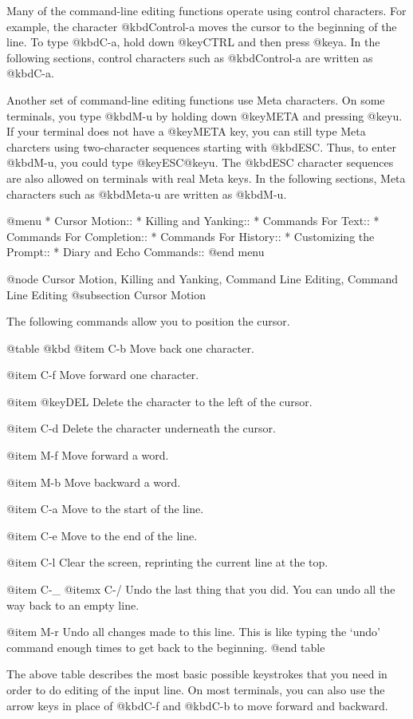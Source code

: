 Many of the command-line editing functions operate using control
characters.  For example, the character @kbd{Control-a} moves the cursor
to the beginning of the line.  To type @kbd{C-a}, hold down @key{CTRL}
and then press @key{a}.  In the following sections, control characters
such as @kbd{Control-a} are written as @kbd{C-a}.

Another set of command-line editing functions use Meta characters.  On
some terminals, you type @kbd{M-u} by holding down @key{META} and
pressing @key{u}.  If your terminal does not have a @key{META} key, you
can still type Meta charcters using two-character sequences starting
with @kbd{ESC}.  Thus, to enter @kbd{M-u}, you could type
@key{ESC}@key{u}.  The @kbd{ESC} character sequences are also allowed on
terminals with real Meta keys.  In the following sections, Meta
characters such as @kbd{Meta-u} are written as @kbd{M-u}.

@menu
* Cursor Motion::               
* Killing and Yanking::         
* Commands For Text::           
* Commands For Completion::     
* Commands For History::        
* Customizing the Prompt::      
* Diary and Echo Commands::     
@end menu

@node Cursor Motion, Killing and Yanking, Command Line Editing, Command Line Editing
@subsection Cursor Motion

The following commands allow you to position the cursor.

@table @kbd
@item C-b
Move back one character.

@item C-f
Move forward one character.

@item @key{DEL}
Delete the character to the left of the cursor.

@item C-d
Delete the character underneath the cursor.

@item M-f
Move forward a word.

@item M-b
Move backward a word.

@item C-a
Move to the start of the line.

@item C-e
Move to the end of the line.

@item C-l
Clear the screen, reprinting the current line at the top.

@item C-_
@itemx C-/
Undo the last thing that you did.  You can undo all the way back to an
empty line.

@item M-r
Undo all changes made to this line.  This is like typing the `undo'
command enough times to get back to the beginning.
@end table

The above table describes the most basic possible keystrokes that you need
in order to do editing of the input line.  On most terminals, you can
also use the arrow keys in place of @kbd{C-f} and @kbd{C-b} to move
forward and backward.

